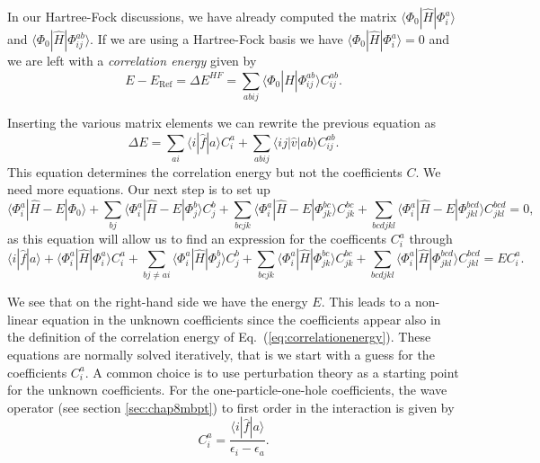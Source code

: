   In our Hartree-Fock discussions, we have already computed
  the matrix $\langle \Phi_0 | \hat{H}|\Phi_{i}^{a}\rangle $ and
  $\langle \Phi_0 | \hat{H}|\Phi_{ij}^{ab}\rangle$.  If we are using a
  Hartree-Fock basis we have $\langle \Phi_0 | \hat{H}|\Phi_{i}^{a}\rangle=0$
  and we are left with a \emph{correlation energy} given by
  \[
  E-E_{\mathrm{Ref}} =\Delta E^{HF}=\sum_{abij}\langle \Phi_0 |
  \hat{H}|\Phi_{ij}^{ab} \rangle C_{ij}^{ab}.
  \]


  Inserting the various matrix elements we can rewrite the previous
  equation as
  \begin{equation}\label{eq:correlationenergy}
  \Delta E=\sum_{ai}\langle i| \hat{f}|a \rangle C_{i}^{a}+
  \sum_{abij}\langle ij | \hat{v}| ab \rangle C_{ij}^{ab}.
  \end{equation}
  This equation determines the correlation energy but not the
  coefficients $C$.  We need more equations. Our next step is to set
  up
  \[ 
  \langle \Phi_i^a | \hat{H} -E| \Phi_0\rangle + \sum_{bj}\langle
  \Phi_i^a | \hat{H} -E|\Phi_{j}^{b} \rangle C_{j}^{b}+
  \sum_{bcjk}\langle \Phi_i^a | \hat{H} -E|\Phi_{jk}^{bc} \rangle
  C_{jk}^{bc}+ \sum_{bcdjkl}\langle \Phi_i^a | \hat{H}
  -E|\Phi_{jkl}^{bcd} \rangle C_{jkl}^{bcd}=0,
  \]
  as this equation will allow us to find an expression for the
  coefficents $C_i^a$  through 
  \begin{equation}\label{eq:c1p1h}
  \langle i | \hat{f}| a\rangle +\langle \Phi_i^a |
  \hat{H}|\Phi_{i}^{a} \rangle C_{i}^{a}+ \sum_{bj\ne ai}\langle
  \Phi_i^a | \hat{H}|\Phi_{j}^{b} \rangle C_{j}^{b}+
  \sum_{bcjk}\langle \Phi_i^a | \hat{H}|\Phi_{jk}^{bc} \rangle
  C_{jk}^{bc}+ \sum_{bcdjkl}\langle \Phi_i^a |
  \hat{H}|\Phi_{jkl}^{bcd} \rangle C_{jkl}^{bcd}=EC_i^a.
  \end{equation}

  We see that on the right-hand side we have the energy $E$. This
  leads to a non-linear equation in the unknown coefficients since the coefficients appear also in the definition of the correlation
energy of Eq.~(\ref{eq:correlationenergy}).  These
  equations are normally solved iteratively, that is we  start
  with a guess for the coefficients $C_i^a$. A common choice is to
  use perturbation theory as a starting point for the unknown coefficients. For the one-particle-one-hole coefficients, the wave operator
(see section \ref{sec:chap8mbpt}) to first order in the interaction is given by
  \[
   C_{i}^{a}=\frac{\langle i | \hat{f}|
     a\rangle}{\epsilon_i-\epsilon_a}.
  \]

